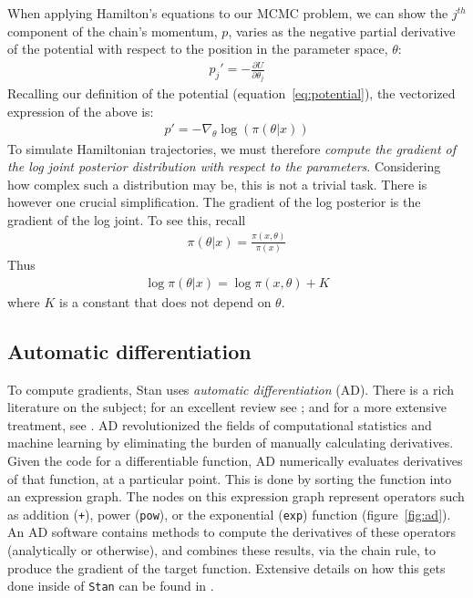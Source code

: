 \documentclass[11pt]{article}
\begin{document}
  When applying Hamilton's equations to our MCMC problem, we can show the $j^{th}$ 
  component of the chain's momentum, $p$, varies as the negative partial derivative of 
  the potential with respect to the position in the parameter space, $\theta$:
  \begin{eqnarray*}
    p_j' = - \frac{\partial{U}}{\partial{\theta_j}}
  \end{eqnarray*}
  Recalling our definition of the potential (equation~\ref{eq:potential}), the vectorized 
  expression of the above is:
  \begin{eqnarray}
    p' = - \nabla_\theta \log(\pi(\theta | x))
  \label{eq:gradient}
  \end{eqnarray}
  To simulate Hamiltonian trajectories, we must therefore \textit{compute the gradient 
  of the log joint posterior distribution with respect to the parameters}.
  Considering how complex such a distribution may be, this is not a trivial task.
  There is however one crucial simplification.
  The gradient of the log posterior is the gradient of the log joint.
  To see this, recall
  \begin{eqnarray*}
    \pi(\theta | x) = \frac{\pi (x, \theta)}{\pi(x)}
  \end{eqnarray*}
  Thus
  \begin{eqnarray*}
    \log \pi(\theta | x) = \log \pi(x, \theta) + K
  \end{eqnarray*}
  where $K$ is a constant that does not depend on $\theta$.
  
  \subsection{Automatic differentiation}

  To compute gradients, Stan uses \textit{automatic differentiation} (AD). 
  There is a rich literature on the subject; for an excellent review see \cite{Baydin:2018};
  and for a more extensive treatment, see \cite{Griewank:2008}.
  AD revolutionized the fields of computational statistics and machine learning by eliminating
  the burden of manually calculating derivatives.
  Given the code for a differentiable function, AD numerically evaluates derivatives
  of that function, at a particular point.
  This is done by sorting the function into an expression graph.
  The nodes on this expression graph represent operators such as addition (\texttt{+}),
  power (\texttt{pow}), or the exponential (\texttt{exp}) function (figure~\ref{fig:ad}).
  An AD software contains methods to compute the derivatives of these operators
  (analytically or otherwise), and combines these results, via the chain rule,
  to produce the gradient of the target function.
  Extensive details on how this gets done inside of \texttt{Stan} can be found in \cite{Carpenter:2015}.
  
\end{document}
